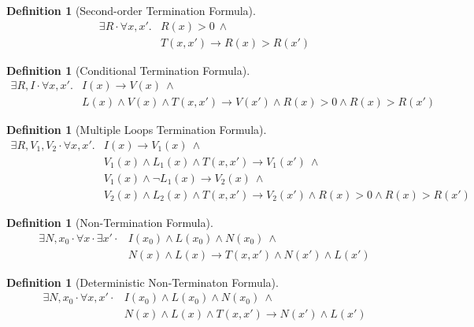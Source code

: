 \documentclass[preprint]{sigplanconf}
\theoremstyle{definition}
\newtheorem{definition}[theorem]{Definition}
\begin{document}
\begin{figure*}
\begin{definition}[Second-order Termination Formula]
\label{def:termination-formula}
\begin{align*}
 \exists R \cdot \forall x, x' . & R(x) > 0 ~ \wedge \\
                             & T(x, x') \rightarrow R(x) > R(x')
\end{align*}
\end{definition}

\begin{definition}[Conditional Termination Formula]
 \begin{align*}
  \exists R, I \cdot \forall x, x' . & I(x) \rightarrow V(x) ~ \wedge \\
                                 & L(x) \wedge V(x) \wedge T(x, x') \rightarrow V(x') \wedge R(x) > 0 \wedge R(x) > R(x')
 \end{align*}
\end{definition}

\begin{definition}[Multiple Loops Termination Formula]
 \begin{align*}
  \exists R, V_1, V_2 \cdot \forall x, x' . & I(x) \rightarrow V_1(x) ~ \wedge \\
                                        & V_1(x) \wedge L_1(x) \wedge T(x, x') \rightarrow V_1(x') ~ \wedge \\
                                        & V_1(x) \wedge \lnot L_1(x) \rightarrow V_2(x) ~ \wedge \\
                                        & V_2(x) \wedge L_2(x) \wedge T(x, x') \rightarrow V_2(x') \wedge R(x) > 0 \wedge R(x) > R(x')
 \end{align*}
\end{definition}

\begin{definition}[Non-Termination Formula]
\label{def:nonterm-formula}
 \begin{align*}
  \exists N, x_0 \cdot \forall x \cdot \exists x' \cdot & I(x_0) \wedge L(x_0) \wedge N(x_0) ~ \wedge \\
							& N(x) \wedge L(x) \rightarrow T(x, x') \wedge N(x') \wedge L(x')
 \end{align*}
\end{definition}

\begin{definition}[Deterministic Non-Terminaton Formula]
 \begin{align*}
  \exists N, x_0 \cdot \forall x, x' \cdot & I(x_0) \wedge L(x_0) \wedge N(x_0) ~ \wedge \\
							& N(x) \wedge L(x) \wedge T(x, x') \rightarrow N(x') \wedge L(x')
 \end{align*} 
\end{definition}

\caption{The halting problem defined in second-order logic.\label{fig:termination-formulae}}
\end{figure*}
\end{document}
